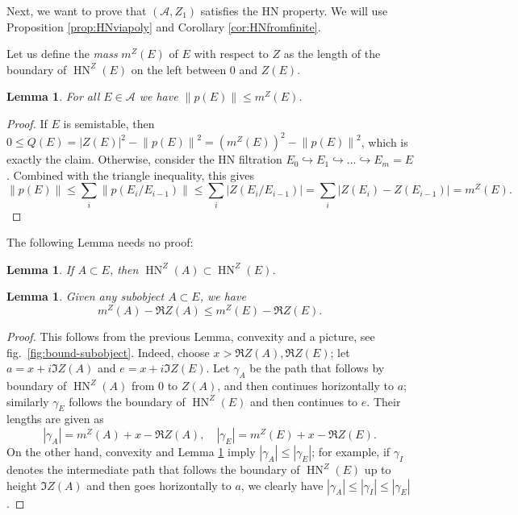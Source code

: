 \documentclass[leqno,11pt,twoside]{amsart}
\newtheorem{Lem}[Thm]{Lemma}
\theoremstyle{definition}
\begin{document}
Next, we want to prove that $({\ensuremath{\mathcal A}}, Z_1)$ satisfies the HN property. We will use
Proposition \ref{prop:HNviapoly} and Corollary \ref{cor:HNfromfinite}. 

Let us define the \emph{mass} $m^Z(E)$ of $E$ with respect to $Z$ as the length of the boundary
of ${\mathop{\mathrm{HN}}\nolimits}^Z(E)$ on the left between $0$ and $Z(E)$.

\begin{Lem} \label{lem:boundZ}
For all $E \in {\ensuremath{\mathcal A}}$ we have
${\left\|{p(E)}\right\|} \le m^Z(E)$.
\end{Lem}
\begin{proof}
If $E$ is semistable, then
$0 \le Q(E) = {\left\lvert{Z(E)}\right\rvert}^2 - {\left\|{p(E)}\right\|}^2
= \left(m^Z(E)\right)^2 - {\left\|{p(E)}\right\|}^2$, which is exactly the claim. 
Otherwise, consider the HN filtration $E_0 {\ensuremath{\hookrightarrow}} E_1
{\ensuremath{\hookrightarrow}} \dots {\ensuremath{\hookrightarrow}} E_m = E$. Combined with the triangle inequality, this gives
\[
{\left\|{p(E)}\right\|} \le \sum_i {\left\|{p(E_i/E_{i-1})}\right\|} \le \sum_i {\left\lvert{Z(E_i/E_{i-1})}\right\rvert}
= \sum_i {\left\lvert{Z(E_i) - Z(E_{i-1})}\right\rvert} = m^Z(E).
\]
\end{proof}

The following Lemma needs no proof:
\begin{Lem} \label{lem:subHNpoly}
If $A \subset E$, then ${\mathop{\mathrm{HN}}\nolimits}^Z(A) \subset {\mathop{\mathrm{HN}}\nolimits}^Z(E)$.
\end{Lem}

\begin{Lem} \label{lem:boundlength}
Given any subobject $A \subset E$, we have
\[ m^Z(A) - \Re Z(A) \le m^Z(E) - \Re Z(E). \]
\end{Lem}
\begin{proof}
This follows from the previous Lemma, convexity and a picture, see
fig.~\ref{fig:bound-subobject}. Indeed, choose $x > \Re Z(A), \Re Z(E)$; let $a = x + i \Im Z(A)$ and
$e = x + i \Im Z(E)$. Let $\gamma_A$ be the path that follows by boundary of ${\mathop{\mathrm{HN}}\nolimits}^Z(A)$ from $0$ to
$Z(A)$, and then continues horizontally to $a$; similarly $\gamma_E$ follows the boundary of
${\mathop{\mathrm{HN}}\nolimits}^Z(E)$ and then continues to $e$. Their lengths are given as
\[ {\left\lvert{\gamma_A}\right\rvert} = m^Z(A) + x - \Re Z(A), \quad {\left\lvert{\gamma_E}\right\rvert} = m^Z(E) + x - \Re Z(E).
\]
On the other hand, convexity and Lemma \ref{lem:subHNpoly} imply ${\left\lvert{\gamma_A}\right\rvert} \le
{\left\lvert{\gamma_E}\right\rvert}$; for example, if $\gamma_I$ denotes the intermediate path that follows the boundary
of ${\mathop{\mathrm{HN}}\nolimits}^Z(E)$ up to height $\Im Z(A)$ and then goes horizontally to $a$, we clearly have
${\left\lvert{\gamma_A}\right\rvert} \le  {\left\lvert{\gamma_I}\right\rvert} \le  {\left\lvert{\gamma_E}\right\rvert}$.
\end{proof}
\end{document}
